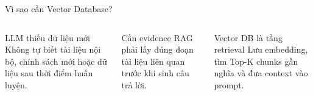 \begin{frame}{Vì sao cần Vector Database?}
	\begin{columns}[T]
		\begin{block}{LLM thiếu dữ liệu mới}
			Không tự biết tài liệu nội bộ, chính sách mới hoặc dữ liệu sau thời điểm huấn luyện.
		\end{block}
		\begin{block}{Cần evidence}
			RAG phải lấy đúng đoạn tài liệu liên quan trước khi sinh câu trả lời.
		\end{block}
		\begin{block}{Vector DB là tầng retrieval}
			Lưu embedding, tìm Top-K chunks gần nghĩa và đưa context vào prompt.
		\end{block}
	\end{columns}
\end{frame}

